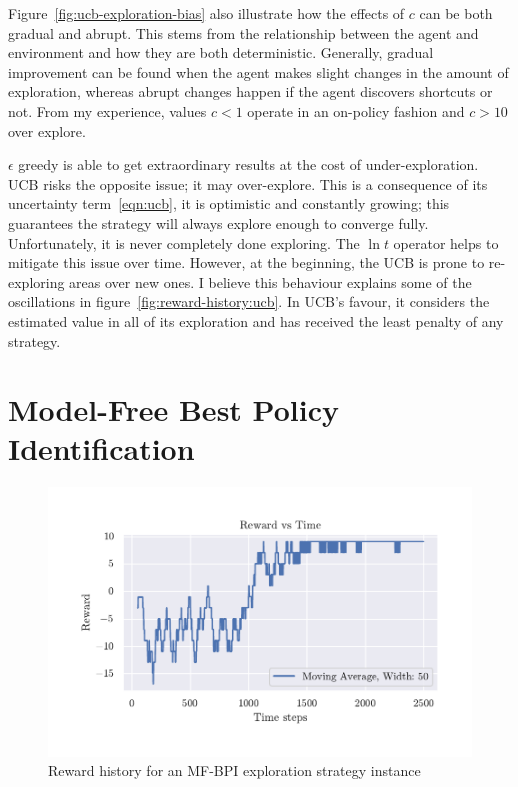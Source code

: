 \documentclass[]{final_report}
\begin{document}
Figure~\ref{fig:ucb-exploration-bias} also illustrate how the effects of $c$ can be both gradual and abrupt. This stems from the relationship between the agent and environment and how they are both deterministic. Generally, gradual improvement can be found when the agent makes slight changes in the amount of exploration, whereas abrupt changes happen if the agent discovers shortcuts or not.  From my experience, values $c<1$ operate in an on-policy fashion and $c>10$ over explore.

$\epsilon$ greedy is able to get extraordinary results at the cost of under-exploration. UCB risks the opposite issue; it may over-explore. This is a consequence of its uncertainty term~\ref{eqn:ucb}, it is optimistic and constantly growing; this guarantees the strategy will always explore enough to converge fully. Unfortunately, it is never completely done exploring. The $\ln t$ operator helps to mitigate this issue over time. However, at the beginning, the UCB is prone to re-exploring areas over new ones. I believe this behaviour explains some of the oscillations in figure~\ref{fig:reward-history:ucb}. In UCB's favour, it considers the estimated value in all of its exploration and has received the least penalty of any strategy.


\section{Model-Free Best Policy Identification}

\begin{figure}[H]
  \centering
  
  \includegraphics[trim={0 1cm 0 1cm},clip,width=\textwidth]{reward-history/MF-BPI.pdf}
  
  \caption{\label{fig:reward-history:mfbpi} Reward history for an MF-BPI exploration strategy instance}
\end{figure}
\end{document}
